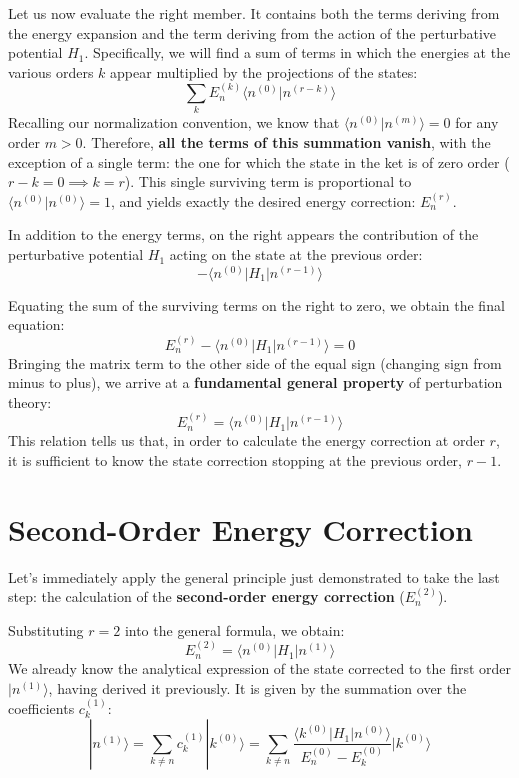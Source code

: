 Let us now evaluate the right member. It contains both the terms deriving from the energy expansion and the term deriving from the action of the perturbative potential $H_1$.
Specifically, we will find a sum of terms in which the energies at the various orders $k$ appear multiplied by the projections of the states:
\begin{equation}
\sum_{k} E_n^{(k)} \langle n^{(0)} | n^{(r-k)} \rangle
\end{equation}
Recalling our normalization convention, we know that $\langle n^{(0)} \vert{} n^{(m)} \rangle = 0$ for any order $m > 0$. Therefore, \textbf{all the terms of this summation vanish}, with the exception of a single term: the one for which the state in the ket is of zero order ($r-k = 0 \implies k=r$).
This single surviving term is proportional to $\langle n^{(0)} \vert{} n^{(0)} \rangle = 1$, and yields exactly the desired energy correction: $E_n^{(r)}$.

In addition to the energy terms, on the right appears the contribution of the perturbative potential $H_1$ acting on the state at the previous order:
\begin{equation}
- \langle n^{(0)} | H_1 | n^{(r-1)} \rangle
\end{equation}

Equating the sum of the surviving terms on the right to zero, we obtain the final equation:
\begin{equation}
E_n^{(r)} - \langle n^{(0)} | H_1 | n^{(r-1)} \rangle = 0
\end{equation}
Bringing the matrix term to the other side of the equal sign (changing sign from minus to plus), we arrive at a \textbf{fundamental general property} of perturbation theory:
\begin{equation}
E_n^{(r)} = \langle n^{(0)} | H_1 | n^{(r-1)} \rangle
\end{equation}
This relation tells us that, in order to calculate the energy correction at order $r$, it is sufficient to know the state correction stopping at the previous order, $r-1$.

\section{Second-Order Energy Correction}

Let's immediately apply the general principle just demonstrated to take the last step: the calculation of the \textbf{second-order energy correction} ($E_n^{(2)}$).

Substituting $r=2$ into the general formula, we obtain:
\begin{equation}
E_n^{(2)} = \langle n^{(0)} | H_1 | n^{(1)} \rangle
\end{equation}
We already know the analytical expression of the state corrected to the first order $\vert{}n^{(1)}\rangle$, having derived it previously. It is given by the summation over the coefficients $c_k^{(1)}$:
\begin{equation}
|n^{(1)}\rangle = \sum_{k \neq n} c_k^{(1)} |k^{(0)}\rangle = \sum_{k \neq n} \frac{\langle k^{(0)} | H_1 | n^{(0)} \rangle}{E_n^{(0)} - E_k^{(0)}} |k^{(0)}\rangle
\end{equation}

